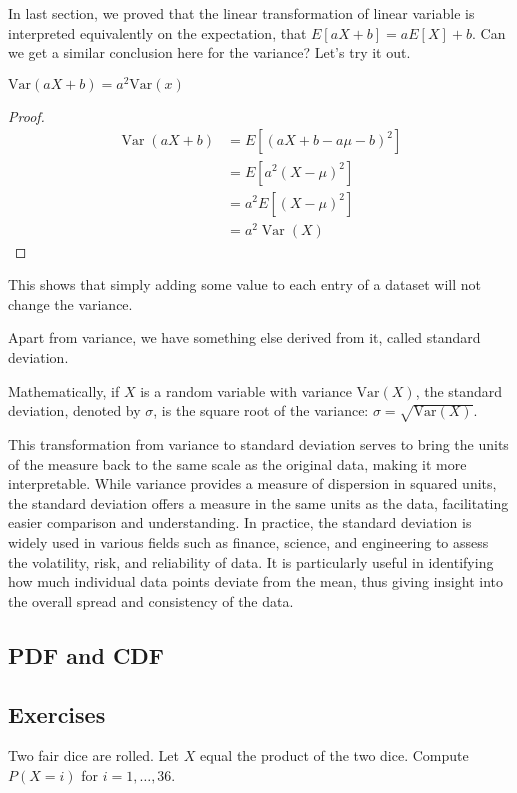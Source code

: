 In last section, we proved that the linear transformation of linear variable is interpreted equivalently on the expectation, that $E[aX+b] = aE[X]+b$. Can we get a similar conclusion here for the variance? Let's try it out.

\begin{proposition}
    $\text{Var}(aX+b) = a^2\text{Var}(x)$
\end{proposition}
\begin{proof}
    $$\begin{aligned}\operatorname{Var}(a X+b) & =E\left[(a X+b-a \mu-b)^{2}\right] \\& =E\left[a^{2}(X-\mu)^{2}\right] \\& =a^{2} E\left[(X-\mu)^{2}\right] \\& =a^{2} \operatorname{Var}(X)\end{aligned}$$
\end{proof}

This shows that simply adding some value to each entry of a dataset will not change the variance. 

Apart from variance, we have something else derived from it, called standard deviation.
\begin{definition}
Mathematically, if \(X\) is a random variable with variance \(\text{Var}(X)\), the standard deviation, denoted by \(\sigma\), is the square root of the variance: \(\sigma = \sqrt{\text{Var}(X)}\). 
\end{definition}

This transformation from variance to standard deviation serves to bring the units of the measure back to the same scale as the original data, making it more interpretable. While variance provides a measure of dispersion in squared units, the standard deviation offers a measure in the same units as the data, facilitating easier comparison and understanding. In practice, the standard deviation is widely used in various fields such as finance, science, and engineering to assess the volatility, risk, and reliability of data. It is particularly useful in identifying how much individual data points deviate from the mean, thus giving insight into the overall spread and consistency of the data.

\subsection{PDF and CDF}

\subsection{Exercises}
\begin{exercise}
Two fair dice are rolled. Let \(X\) equal the product of the two dice. Compute \(P(X = i)\) for \(i = 1, \ldots, 36\).
\end{exercise}

